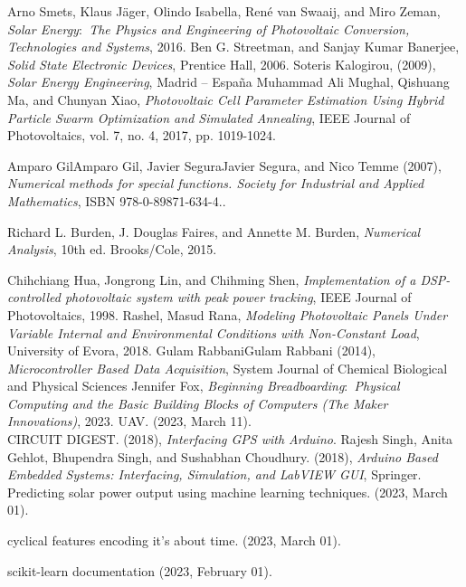 \documentclass{report}
\begin{document}
\begin{thebibliography}{9}
Arno Smets, Klaus Jäger, Olindo Isabella, René van Swaaij, and Miro Zeman, \emph{Solar Energy$:$ The Physics and Engineering of Photovoltaic Conversion, Technologies and Systems}, 2016. 
Ben G. Streetman, and Sanjay Kumar Banerjee, \emph{Solid State Electronic Devices}, Prentice Hall, 2006.
Soteris Kalogirou, (2009), \emph{Solar Energy Engineering},
Madrid – España
Muhammad Ali Mughal, Qishuang Ma, and Chunyan Xiao, \emph{Photovoltaic Cell Parameter Estimation Using Hybrid Particle Swarm Optimization and Simulated Annealing}, IEEE Journal of Photovoltaics, vol. 7, no. 4, 2017, pp. 1019-1024.

Amparo GilAmparo Gil, Javier SeguraJavier Segura, and Nico Temme (2007), \emph{ Numerical methods for special functions. Society for Industrial and Applied Mathematics}, ISBN 978-0-89871-634-4..

Richard L. Burden, J. Douglas Faires, and Annette M. Burden, \emph{Numerical Analysis}, 10th ed. Brooks/Cole, 2015.

Chihchiang Hua, Jongrong Lin, and Chihming Shen, \emph{Implementation of a DSP-controlled photovoltaic system with peak power tracking}, IEEE Journal of Photovoltaics, 1998.
Rashel, Masud Rana, \emph{Modeling Photovoltaic Panels Under Variable Internal and Environmental Conditions with Non-Constant Load}, University of Evora, 2018.
Gulam RabbaniGulam Rabbani (2014), \emph{Microcontroller Based Data Acquisition}, System Journal of Chemical Biological and Physical Sciences
Jennifer Fox, \emph{Beginning Breadboarding$:$ Physical Computing and the Basic Building Blocks of Computers (The Maker Innovations)}, 2023.
UAV. (2023, March 11).
\\
CIRCUIT DIGEST. (2018), \emph{Interfacing GPS with Arduino}.
Rajesh Singh, Anita Gehlot, Bhupendra Singh, and Sushabhan Choudhury. (2018), \emph{Arduino Based Embedded Systems: Interfacing, Simulation, and LabVIEW GUI}, Springer.
Predicting solar power output using machine learning techniques. (2023, March 01).
\\

cyclical features encoding it’s about time. (2023, March 01).
\\

scikit-learn documentation  (2023, February 01).
\\


\end{thebibliography}
\end{document}

